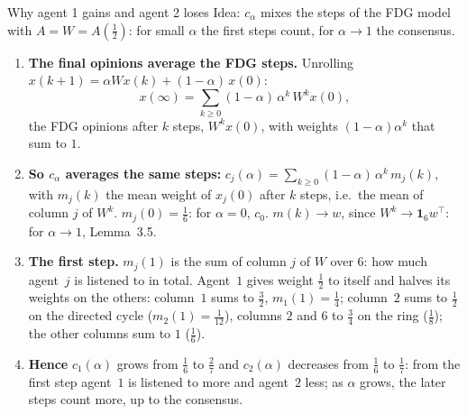 \documentclass[10pt, aspectratio=169]{beamer}
\begin{document}
\begin{frame}[label=m-lemma-why]{Why agent 1 gains and agent 2 loses}
  \footnotesize
  \alert{Idea:} $c_\alpha$ mixes the steps of the FDG model with $A = W = A(\frac12)$: for
  small $\alpha$ the first steps count, for $\alpha \to 1$ the consensus.
  \begin{enumerate}
    \setlength{\itemsep}{3pt}
    \item \textbf{The final opinions average the FDG steps.} Unrolling
          $x(k+1) = \alpha W x(k) + (1-\alpha)\,x(0)$:
          \[ x(\infty) = \sum_{k \geq 0} (1-\alpha)\,\alpha^k\, W^k x(0) , \]
          the FDG opinions after $k$ steps, $W^k x(0)$, with weights $(1-\alpha)\alpha^k$
          that sum to $1$.
    \item \textbf{So $c_\alpha$ averages the same steps:}
          $c_j(\alpha) = \sum_{k \geq 0} (1-\alpha)\,\alpha^k\, m_j(k)$, with $m_j(k)$ the
          mean weight of $x_j(0)$ after $k$ steps, i.e.\ the mean of column $j$ of $W^k$.
          $m_j(0) = \frac16$: for $\alpha = 0$, $c_0$. $m(k) \to w$, since
          $W^k \to \mathbf{1}_6 w^\top$: for $\alpha \to 1$, Lemma~3.5.
    \item \textbf{The first step.} $m_j(1)$ is the sum of column $j$ of $W$ over $6$: how
          much agent~$j$ is listened to in total. Agent~$1$ gives weight $\frac12$ to itself
          and halves its weights on the others: column~$1$ sums to $\frac32$,
          $m_1(1) = \frac14$; column~$2$ sums to $\frac12$ on the directed cycle
          ($m_2(1) = \frac1{12}$), columns $2$ and $6$ to $\frac34$ on the ring
          ($\frac18$); the other columns sum to $1$ ($\frac16$).
    \item \textbf{Hence} $c_1(\alpha)$ grows from $\frac16$ to $\frac27$ and $c_2(\alpha)$
          decreases from $\frac16$ to $\frac17$: from the first step agent~$1$ is listened
          to more and agent~$2$ less; as $\alpha$ grows, the later steps count more, up to
          the consensus.
  \end{enumerate}
\end{frame}
\end{document}
